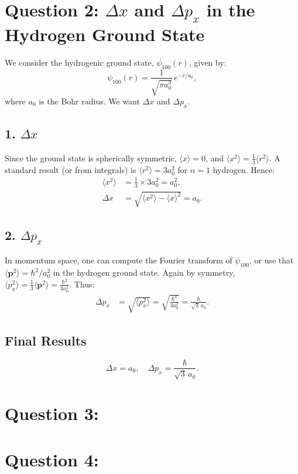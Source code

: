 \documentclass[12pt]{article}
\begin{document}


\section*{Question 2: $\Delta x$ and $\Delta p_x$ in the Hydrogen Ground State}

We consider the hydrogenic ground state, $\psi_{100}(r)$, given by:
\begin{equation}
\psi_{100}(r) = \frac{1}{\sqrt{\pi a_0^3}}\, e^{-r/a_0},
\end{equation}
where $a_0$ is the Bohr radius. We want $\Delta x$ and $\Delta p_x$.

\subsection*{1. $\Delta x$}
Since the ground state is spherically symmetric, $\langle x \rangle = 0$, and $\langle x^2\rangle = \frac{1}{3}\langle r^2\rangle$. A standard result (or from integrals) is $\langle r^2\rangle = 3 a_0^2$ for $n=1$ hydrogen. Hence:
\begin{align*}
\langle x^2 \rangle &= \frac{1}{3}\times 3 a_0^2 = a_0^2,\\
\Delta x &= \sqrt{\langle x^2\rangle - \langle x\rangle^2} = a_0.
\end{align*}

\subsection*{2. $\Delta p_x$}
In momentum space, one can compute the Fourier transform of $\psi_{100}$, or use that $\langle \mathbf{p}^2\rangle = \hbar^2 / a_0^2$ in the hydrogen ground state. Again by symmetry, $\langle p_x^2\rangle = \frac{1}{3}\langle \mathbf{p}^2\rangle = \frac{\hbar^2}{3 a_0^2}$. Thus:
\begin{align*}
\Delta p_x &= \sqrt{\langle p_x^2\rangle} = \sqrt{\frac{\hbar^2}{3 a_0^2}} = \frac{\hbar}{\sqrt{3}\,a_0}.
\end{align*}

\subsection*{Final Results}
\begin{equation}
\boxed{
\Delta x = a_0, \quad\Delta p_x = \frac{\hbar}{\sqrt{3}\,a_0}.
}
\end{equation}



\section*{Question 3:}


\section*{Question 4:}
\end{document}
